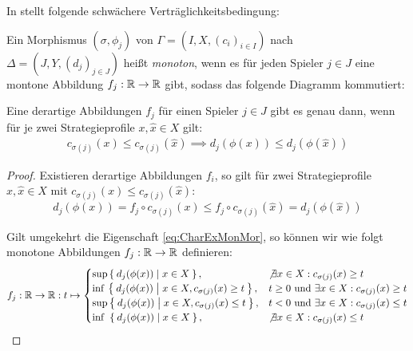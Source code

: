 In \cite{LapGameCat} stellt \citeauthor{LapGameCat} folgende schwächere Verträglichkeitsbedingung:

\begin{defn}
	Ein Morphismus $(\sigma, \phi_j)$ von $\Gamma = (I, X, (c_i)_{i\in I})$ nach $\Delta = (J, Y, (d_j)_{j\in J})$ heißt \emph{monoton}, wenn es für jeden Spieler $j \in J$ eine montone Abbildung $f_j: \mathbb{R} \to \mathbb{R}$ gibt, sodass das folgende Diagramm kommutiert:	
	\begin{center}
	\end{center}
\end{defn}

\begin{bem}
	Eine derartige Abbildungen $f_j$ für einen Spieler $j \in J$ gibt es genau dann, wenn für je zwei Strategieprofile $x, \hat{x} \in X$ gilt:
		\begin{align}\label{eq:CharExMonMor}
			c_{\sigma(j)}(x) \leq c_{\sigma(j)}(\hat{x}) \implies d_j(\phi(x)) \leq d_j(\phi(\hat{x}))
		\end{align}
\end{bem}

\begin{proof}
	Existieren derartige Abbildungen $f_i$, so gilt für zwei Strategieprofile $x, \hat{x} \in X$ mit $c_{\sigma(j)}(x) \leq c_{\sigma(j)}(\hat{x})$:
		\[d_j(\phi(x)) = f_j\circ c_{\sigma(j)}(x) \leq f_j\circ c_{\sigma(j)}(\hat{x}) = d_j(\phi(\hat{x}))\]
		
	Gilt umgekehrt die Eigenschaft \ref{eq:CharExMonMor}, so können wir wie folgt monotone Abbildungen $f_j: \mathbb{R} \to \mathbb{R}$ definieren:
		\[f_j: \mathbb{R} \to \mathbb{R}: t \mapsto \begin{cases}
			\sup \Set{d_j(\phi(x)) | x \in X},								&\not\exists x \in X: c_{\sigma(j)}(x) \geq t \\
			\inf\, \Set{d_j(\phi(x)) | x \in X, c_{\sigma(j)}(x) \geq t}, 	&t \geq 0 \text{ und } \exists x \in X: c_{\sigma(j)}(x) \geq t\\
			\sup \Set{d_j(\phi(x)) | x \in X, c_{\sigma(j)}(x) \leq t}, 	&t <    0 \text{ und } \exists x \in X: c_{\sigma(j)}(x) \leq t\\
			\inf\,\, \Set{d_j(\phi(x)) | x \in X},							&\not\exists x \in X: c_{\sigma(j)}(x) \leq t 
		\end{cases} \]
\end{proof}

